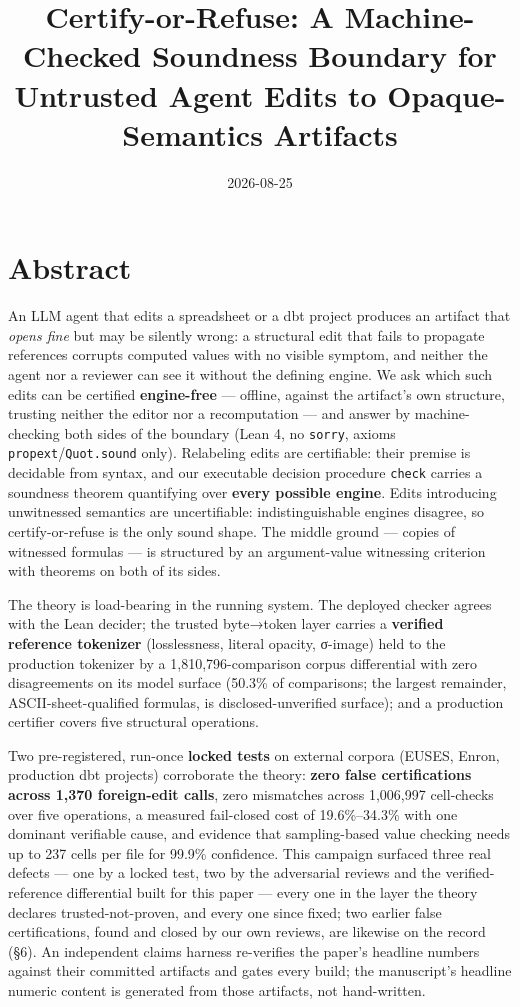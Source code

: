 \documentclass[
  11pt,
]{article}
\title{Certify-or-Refuse: A Machine-Checked Soundness Boundary for
Untrusted Agent Edits to Opaque-Semantics Artifacts}
\author{}
\date{2026-08-25}
\begin{document}
\maketitle

\section{Abstract}\label{abstract}

An LLM agent that edits a spreadsheet or a dbt project produces an
artifact that \emph{opens fine} but may be silently wrong: a structural
edit that fails to propagate references corrupts computed values with no
visible symptom, and neither the agent nor a reviewer can see it without
the defining engine. We ask which such edits can be certified
\textbf{engine-free} --- offline, against the artifact's own structure,
trusting neither the editor nor a recomputation --- and answer by
machine-checking both sides of the boundary (Lean 4, no \texttt{sorry},
axioms \texttt{propext}/\texttt{Quot.sound} only). Relabeling edits are
certifiable: their premise is decidable from syntax, and our executable
decision procedure \texttt{check} carries a soundness theorem
quantifying over \textbf{every possible engine}. Edits introducing
unwitnessed semantics are uncertifiable: indistinguishable engines
disagree, so certify-or-refuse is the only sound shape. The middle
ground --- copies of witnessed formulas --- is structured by an
argument-value witnessing criterion with theorems on both of its sides.

The theory is load-bearing in the running system. The deployed checker
agrees with the Lean decider; the trusted byte→token layer carries a
\textbf{verified reference tokenizer} (losslessness, literal opacity,
σ-image) held to the production tokenizer by a 1,810,796-comparison
corpus differential with zero disagreements on its model surface (50.3\%
of comparisons; the largest remainder, ASCII-sheet-qualified formulas,
is disclosed-unverified surface); and a production certifier covers five
structural operations.

Two pre-registered, run-once \textbf{locked tests} on external corpora
(EUSES, Enron, production dbt projects) corroborate the theory:
\textbf{zero false certifications across 1,370 foreign-edit calls}, zero
mismatches across 1,006,997 cell-checks over five operations, a measured
fail-closed cost of 19.6\%--34.3\% with one dominant verifiable cause,
and evidence that sampling-based value checking needs up to 237 cells
per file for 99.9\% confidence. This campaign surfaced three real
defects --- one by a locked test, two by the adversarial reviews and the
verified-reference differential built for this paper --- every one in
the layer the theory declares trusted-not-proven, and every one since
fixed; two earlier false certifications, found and closed by our own
reviews, are likewise on the record (§6). An independent claims harness
re-verifies the paper's headline numbers against their committed
artifacts and gates every build; the manuscript's headline numeric
content is generated from those artifacts, not hand-written.
\end{document}

